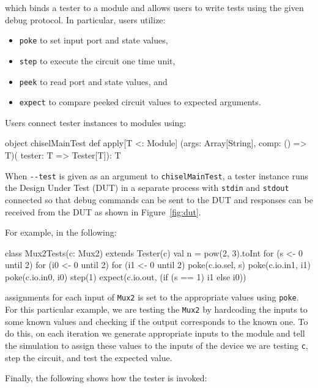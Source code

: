 \documentclass[twocolumn,10pt]{article}
\newcommand{\comment}[1]{\emph{Comment: #1}}
\renewcommand{\comment}[1]{}
\def\code#1{{\tt #1}}
\begin{document}
\noindent
which binds a tester to a module
and allows users to write tests using the given debug protocol.  In particular, users utilize:
\begin{itemize}
\item \code{poke} to set input port and state values,
\item \code{step} to execute the circuit one time unit,
\item \code{peek} to read port and state values, and
\item \code{expect} to compare peeked circuit values to expected arguments.
\end{itemize}

\noindent
Users connect tester instances to modules using:


\begin{scala}
object chiselMainTest {
  def apply[T <: Module]
    (args: Array[String], comp: () => T)(
     tester: T => Tester[T]): T
}
\end{scala}

\noindent
When \code{-{-}test} is given as an argument to \code{chiselMainTest}, a
tester instance runs the Design Under Test (DUT) in a separate
process with \code{stdin} and \code{stdout} connected so that debug commands can 
be sent to the DUT and responses can be received from the DUT as shown in
Figure~\ref{fig:dut}.
\noindent

For example, in the following:

\begin{scala}
class Mux2Tests(c: Mux2) extends Tester(c) {
  val n = pow(2, 3).toInt
  for (s <- 0 until 2) {
    for (i0 <- 0 until 2) {
      for (i1 <- 0 until 2) {
        poke(c.io.sel, s)
        poke(c.io.in1, i1)
        poke(c.io.in0, i0)
        step(1)
        expect(c.io.out, (if (s == 1) i1 else i0))
      }
    }
  }
}
\end{scala}

\noindent
assignments for each input of \verb+Mux2+ is set to the appropriate values using \verb+poke+. For this particular example, we are testing the \verb+Mux2+ by hardcoding the inputs to some known values and checking if the output corresponds to the known one. To do this, on each iteration we generate appropriate inputs to the module and tell the simulation to assign these values to the inputs of the device we are testing \verb+c+, step the circuit, and test the expected value.  
\comment{Maybe elaborate a little bit what a step does. I assume it is one clock tick
Is a step needed as well for testing plain combinational circuits?}
Finally, the following shows how the tester is invoked:
\end{document}
